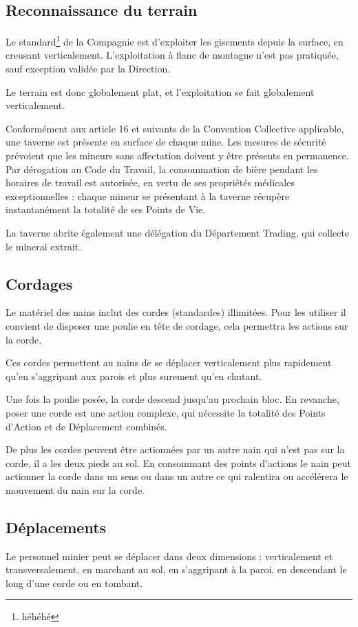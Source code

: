 \subsection{Reconnaissance du terrain}
Le standard\footnote{héhéhé} de la Compagnie est d'exploiter les gisements depuis la surface, en creusant verticalement. L'exploitation à flanc de montagne n'est pas pratiquée, sauf exception validée par la Direction.

Le terrain est donc globalement plat, et l'exploitation se fait globalement verticalement.

Conformément aux article 16 et suivants de la Convention Collective applicable, une taverne est présente en surface de chaque mine. Les mesures de sécurité prévoient que les mineurs sans affectation doivent y être présents en permanence. Par dérogation au Code du Travail, la consommation de bière pendant les horaires de travail est autorisée, en vertu de ses propriétés médicales exceptionnelles : chaque mineur se présentant à la taverne récupère instantanément la totalité de ses Points de Vie.

La taverne abrite également une délégation du Département Trading, qui collecte le minerai extrait.

\subsection{Cordages}
Le matériel des nains inclut des cordes (standardes) illimitées. Pour les utiliser il convient de disposer une poulie en tête de cordage, cela permettra les actions sur la corde.

Ces cordes permettent au nains de se déplacer verticalement plus rapidement qu'en s'aggripant aux parois et plus surement qu'en chutant.

Une fois la poulie posée, la corde descend jusqu'au prochain bloc.
En revanche, poser une corde est une action complexe, qui nécessite la totalité des Points d'Action et de Déplacement combinés.


De plus les cordes peuvent être actionnées par un autre nain qui n'est pas sur la corde, il a les deux pieds au sol. En consommant des points d'actions le nain peut actionner la corde dans un sens ou dans un autre ce qui ralentira ou accélérera le mouvement du nain sur la corde.

\subsection{Déplacements}
Le personnel minier peut se déplacer dans deux dimensions : verticalement et transversalement, en marchant au sol, en s'aggripant à la paroi, en descendant le long d'une corde ou en tombant.

